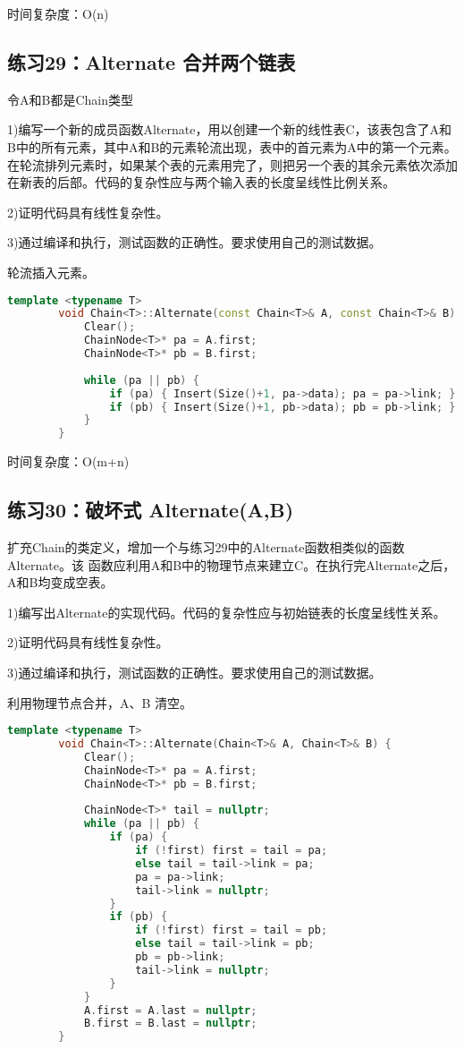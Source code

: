\documentclass[UTF8]{ctexart}
\begin{document}
	 时间复杂度：O(n)
	
	
	
	\subsection*{练习29：Alternate 合并两个链表}
	令A和B都是Chain类型
	
	1)编写一个新的成员函数Alternate，用以创建一个新的线性表C，该表包含了A和B中的所有元素，其中A和B的元素轮流出现，表中的首元素为A中的第一个元素。在轮流排列元素时，如果某个表的元素用完了，则把另一个表的其余元素依次添加在新表的后部。代码的复杂性应与两个输入表的长度呈线性比例关系。
	
	2)证明代码具有线性复杂性。
	
	3)通过编译和执行，测试函数的正确性。要求使用自己的测试数据。
	
	轮流插入元素。
	
	\begin{lstlisting}[language=C++]
		template <typename T>
		void Chain<T>::Alternate(const Chain<T>& A, const Chain<T>& B) {
			Clear();
			ChainNode<T>* pa = A.first;
			ChainNode<T>* pb = B.first;
			
			while (pa || pb) {
				if (pa) { Insert(Size()+1, pa->data); pa = pa->link; }
				if (pb) { Insert(Size()+1, pb->data); pb = pb->link; }
			}
		}
	\end{lstlisting}
	
	 时间复杂度：O(m+n)
	
	
	
	\subsection*{练习30：破坏式 Alternate(A,B)}
	扩充Chain的类定义，增加一个与练习29中的Alternate函数相类似的函数Alternate。该
	函数应利用A和B中的物理节点来建立C。在执行完Alternate之后，A和B均变成空表。
	
	1)编写出Alternate的实现代码。代码的复杂性应与初始链表的长度呈线性关系。
	
	2)证明代码具有线性复杂性。
	
	3)通过编译和执行，测试函数的正确性。要求使用自己的测试数据。
	
	利用物理节点合并，A、B 清空。
	
	\begin{lstlisting}[language=C++]
		template <typename T>
		void Chain<T>::Alternate(Chain<T>& A, Chain<T>& B) {
			Clear();
			ChainNode<T>* pa = A.first;
			ChainNode<T>* pb = B.first;
			
			ChainNode<T>* tail = nullptr;
			while (pa || pb) {
				if (pa) {
					if (!first) first = tail = pa;
					else tail = tail->link = pa;
					pa = pa->link;
					tail->link = nullptr;
				}
				if (pb) {
					if (!first) first = tail = pb;
					else tail = tail->link = pb;
					pb = pb->link;
					tail->link = nullptr;
				}
			}
			A.first = A.last = nullptr;
			B.first = B.last = nullptr;
		}
	\end{lstlisting}
	
\end{document}
